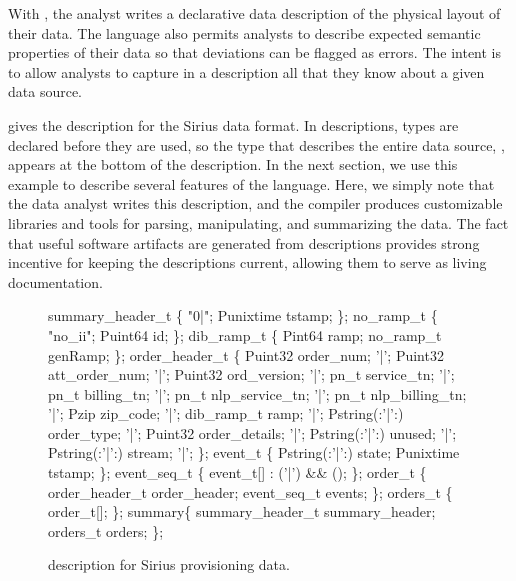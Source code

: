 \documentclass{sigplanconf}
\newcommand{\dibbler}{Sirius}
\begin{document}
With \pads{}, the analyst writes a declarative data description of the
physical layout of their data.  The language also permits analysts to
describe expected semantic properties of their data so that deviations
can be flagged as errors. The intent is to allow analysts to capture
in a \pads{} description all that they know about a given data source.

 gives the \pads{} description for the
\dibbler{} data format.  In \pads{} descriptions, types are declared
before they are used, so the type that describes the entire data
source, , appears at the bottom of the description.  In
the next section, we use this example to describe several features of
the \pads{} language.  Here, we simply note that the data analyst
writes this description, and the \pads{} compiler produces
customizable \C{} libraries and tools for parsing, manipulating, and
summarizing the data.  The fact that useful software artifacts are
generated from \pads{} descriptions provides strong incentive for
keeping the descriptions current, allowing them to serve as living
documentation.

\begin{figure}
\begin{small}
\begin{code}
  summary\_header\_t \{
  "0|";
  Punixtime tstamp;
\};
\mbox{}
 no\_ramp\_t \{
  "no\_ii";
  Puint64 id;
\};
\mbox{}
 dib\_ramp\_t \{
  Pint64     ramp;
  no\_ramp\_t  genRamp;
\};
\mbox{}
 order\_header\_t \{
       Puint32             order\_num;
 '|';  Puint32             att\_order\_num;
 '|';  Puint32             ord\_version;
 '|';   pn\_t           service\_tn;
 '|';   pn\_t           billing\_tn;
 '|';   pn\_t           nlp\_service\_tn;
 '|';   pn\_t           nlp\_billing\_tn;
 '|';   Pzip           zip\_code;
 '|';  dib\_ramp\_t          ramp;
 '|';  Pstring(:'|':)      order\_type;
 '|';  Puint32             order\_details;
 '|';  Pstring(:'|':)      unused;
 '|';  Pstring(:'|':)      stream;
 '|';
\};
\mbox{}
 event\_t \{
  Pstring(:'|':)    state;   
  Punixtime         tstamp;
\};
\mbox{}
 event\_seq\_t \{
  event\_t[] : ('|') && ();
\};
\mbox{}
  order\_t \{
  order\_header\_t  order\_header;
  event\_seq\_t     events;
\};
\mbox{}
 orders\_t \{
  order\_t[];
\};
\mbox{}
  summary\{
  summary\_header\_t  summary\_header;
  orders\_t          orders;
\};
\end{code}
\end{small}
\caption{\pads{} description for \dibbler{} provisioning data.}
\label{figure:dibbler}
\end{figure}
\end{document}

